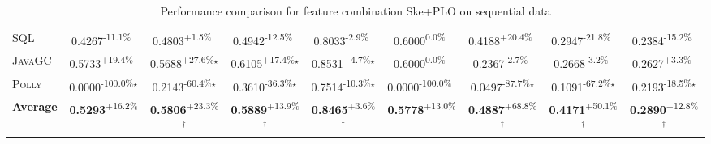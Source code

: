\begin{table}[htbp]
\begin{tabular}{l|cccc|cccc}
\textsc{SQL} & \cellcolor{red!30}0.4267\textsuperscript{-11.1\%}$^{\,\,\,}$ & \cellcolor{green!30}0.4803\textsuperscript{+1.5\%}$^{\,\,\,}$ & \cellcolor{red!30}0.4942\textsuperscript{-12.5\%}$^{\,\,\,}$ & \cellcolor{red!30}0.8033\textsuperscript{-2.9\%}$^{\,\,\,}$ & \cellcolor{red!30}0.6000\textsuperscript{0.0\%}$^{\,\,\,}$ & \cellcolor{green!30}0.4188\textsuperscript{+20.4\%}$^{\,\,\,}$ & \cellcolor{red!30}0.2947\textsuperscript{-21.8\%}$^{\,\,\,}$ & \cellcolor{red!30}0.2384\textsuperscript{-15.2\%}$^{\,\,\,}$ \\
\textsc{JavaGC} & \cellcolor{green!30}0.5733\textsuperscript{+19.4\%}$^{\,\,\,}$ & \cellcolor{green!30}0.5688\textsuperscript{+27.6\%}$^\star$ & \cellcolor{green!30}0.6105\textsuperscript{+17.4\%}$^\star$ & \cellcolor{green!30}0.8531\textsuperscript{+4.7\%}$^\star$ & \cellcolor{red!30}0.6000\textsuperscript{0.0\%}$^{\,\,\,}$ & \cellcolor{red!30}0.2367\textsuperscript{-2.7\%}$^{\,\,\,}$ & \cellcolor{red!30}0.2668\textsuperscript{-3.2\%}$^{\,\,\,}$ & \cellcolor{green!30}0.2627\textsuperscript{+3.3\%}$^{\,\,\,}$ \\
\textsc{Polly} & \cellcolor{red!30}0.0000\textsuperscript{-100.0\%}$^\star$ & \cellcolor{red!30}0.2143\textsuperscript{-60.4\%}$^\star$ & \cellcolor{red!30}0.3610\textsuperscript{-36.3\%}$^\star$ & \cellcolor{red!30}0.7514\textsuperscript{-10.3\%}$^\star$ & \cellcolor{red!30}0.0000\textsuperscript{-100.0\%}$^{\,\,\,}$ & \cellcolor{red!30}0.0497\textsuperscript{-87.7\%}$^\star$ & \cellcolor{red!30}0.1091\textsuperscript{-67.2\%}$^\star$ & \cellcolor{red!30}0.2193\textsuperscript{-18.5\%}$^\star$ \\
\hline
\textbf{Average} & \cellcolor{green!30}\textbf{0.5293}\textsuperscript{+16.2\%}$^{\,\,\,}$ & \cellcolor{green!30}\textbf{0.5806}\textsuperscript{+23.3\%}$^\dagger$ & \cellcolor{green!30}\textbf{0.5889}\textsuperscript{+13.9\%}$^\dagger$ & \cellcolor{green!30}\textbf{0.8465}\textsuperscript{+3.6\%}$^\dagger$ & \cellcolor{green!30}\textbf{0.5778}\textsuperscript{+13.0\%}$^{\,\,\,}$ & \cellcolor{green!30}\textbf{0.4887}\textsuperscript{+68.8\%}$^\dagger$ & \cellcolor{green!30}\textbf{0.4171}\textsuperscript{+50.1\%}$^\dagger$ & \cellcolor{green!30}\textbf{0.2890}\textsuperscript{+12.8\%}$^\dagger$ \\
\hline
\end{tabular}
\caption{Performance comparison for feature combination Ske+PLO on sequential data}
\label{tab:combo_Ske_PLO_performance_sequential}
\end{table}